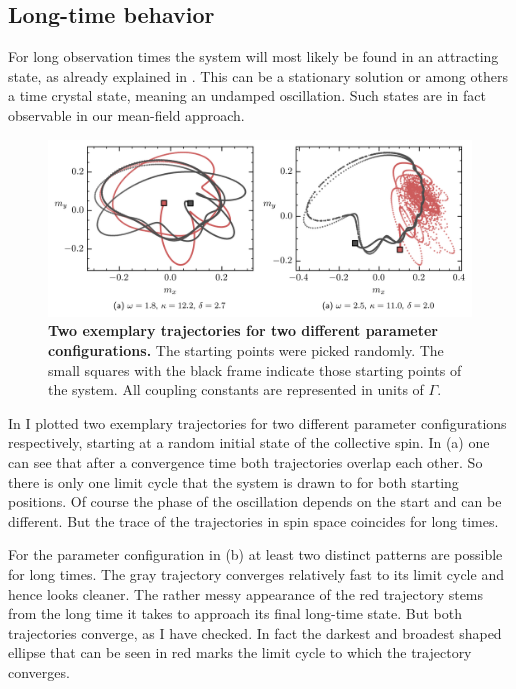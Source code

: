 \subsection{Long-time behavior}
For long observation times the system will most likely be found in an attracting state, as already explained in . This can be a stationary solution or among others a time crystal state, meaning an undamped oscillation. Such states are in fact observable in our mean-field approach. 
\begin{figure}[H]
    \hspace*{-1.2cm}
    \includegraphics[scale=1]{pictures/lc_example.png}
    \caption{\textbf{Two exemplary trajectories for two different parameter configurations.} The starting points were picked randomly. The small squares with the black frame indicate those starting points of the system. All coupling constants are represented in units of $\Gamma$.}
    \label{fig:expl_lc}
\end{figure}
In  I plotted two exemplary trajectories for two different parameter configurations respectively, starting at a random initial state of the collective spin. In  (a) one can see that after a convergence time both trajectories overlap each other. So there is only one limit cycle that the system is drawn to for both starting positions. Of course the phase of the oscillation depends on the start and can be different. But the trace of the trajectories in spin space coincides for long times. 

For the parameter configuration in  (b) at least two distinct patterns are possible for long times. The gray trajectory converges relatively fast to its limit cycle and hence looks cleaner. The rather messy appearance of the red trajectory stems from the long time it takes to approach its final long-time state. But both trajectories converge, as I have checked. In fact the darkest and broadest shaped ellipse that can be seen in red marks the limit cycle to which the trajectory converges.


